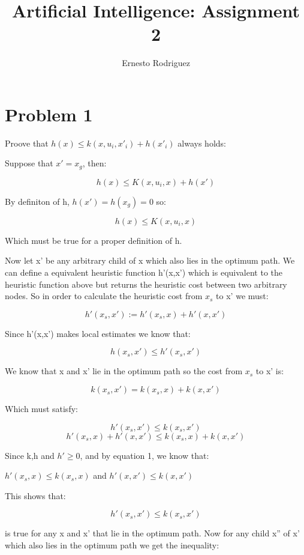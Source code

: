 \documentclass{article}
\title{Artificial Intelligence: Assignment 2}
\author{Ernesto Rodriguez}
\begin{document}
\maketitle

\section{Problem 1}

Proove that $h(x) \leq k(x,u_i,x'_i)+h(x'_i)$ always holds:

Suppose that $x'=x_g$, then:

\begin{equation} h(x) \leq K(x,u_i,x) + h(x') \end{equation}

By definiton of h, $h(x')=h(x_g)=0$ so:

\[ h(x) \leq K(x,u_i,x) \]

Which must be true for a proper definition of h.

Now let x' be any arbitrary child of x which also lies in the optimum path. We can define a equivalent heuristic function h'(x,x') which is equivalent to the heuristic function above but returns the heuristic cost between two arbitrary nodes. So in order to calculate the heuristic cost from $x_s$ to x' we must:

\[h'(x_s,x'):=h'(x_s,x)+h'(x,x') \]

Since h'(x,x') makes local estimates we know that:

\[h(x_s,x') \leq h'(x_s,x')\]

We know that x and x' lie in the optimum path so the cost from $x_s$ to x' is:

\[ k(x_s,x')=k(x_s,x)+k(x,x') \]

Which must satisfy:

\[ h'(x_s,x') \leq k(x_s,x') \]
\[ h'(x_s,x)+h'(x,x') \leq k(x_s,x)+k(x,x') \]

Since k,h and $h'\geq 0$, and by equation 1, we know that:

$h'(x_s,x) \leq k(x_s,x)$ and $h'(x,x') \leq k(x,x')$

This shows that: 

\begin{equation}   
  h'(x_s,x') \leq k(x_s,x')
\end{equation}

 is true for any x and x' that lie in the optimum path. Now for any child x'' of x' which also lies in the optimum path we get the inequality:
\end{document}
